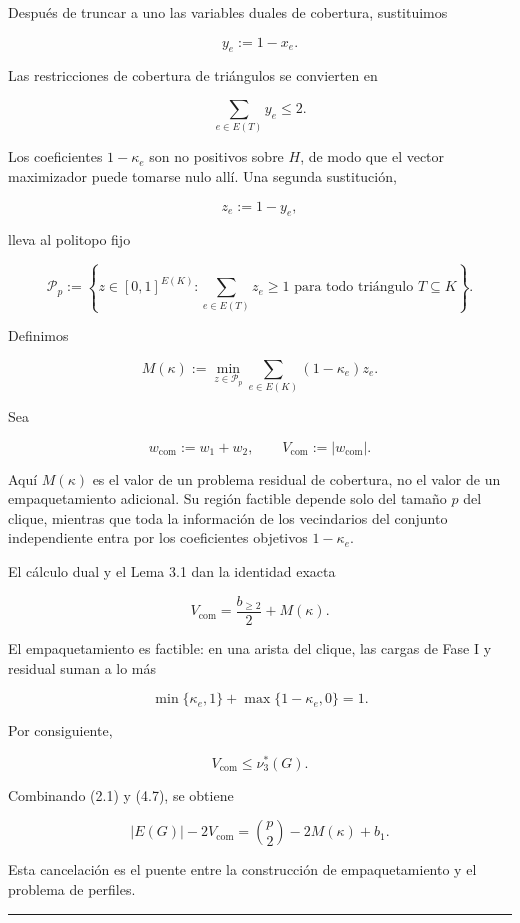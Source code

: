 \documentclass[
  11pt,
]{article}
\begin{document}
Después de truncar a uno las variables duales de cobertura, sustituimos

\[
y_e:=1-x_e.
\]

Las restricciones de cobertura de triángulos se convierten en

\[
\sum_{e\in E(T)}y_e\le2.
\]

Los coeficientes \(1-\kappa_e\) son no positivos sobre \(H\), de modo
que el vector maximizador puede tomarse nulo allí. Una segunda
sustitución,

\[
z_e:=1-y_e,
\]

lleva al politopo fijo

\[
\mathcal P_p
:=
\left\{
z\in[0,1]^{E(K)}:
\sum_{e\in E(T)}z_e\ge1
\text{ para todo triángulo }T\subseteq K
\right\}.
\tag{4.5}
\]

Definimos

\[
M(\kappa)
:=
\min_{z\in\mathcal P_p}
\sum_{e\in E(K)}(1-\kappa_e)z_e.
\tag{4.6}
\]

Sea

\[
w_{\mathrm{com}}:=w_1+w_2,
\qquad
V_{\mathrm{com}}:=|w_{\mathrm{com}}|.
\]

Aquí \(M(\kappa)\) es el valor de un problema residual de cobertura, no
el valor de un empaquetamiento adicional. Su región factible depende
solo del tamaño \(p\) del clique, mientras que toda la información de
los vecindarios del conjunto independiente entra por los coeficientes
objetivos \(1-\kappa_e\).

El cálculo dual y el Lema 3.1 dan la identidad exacta

\[
\boxed{
V_{\mathrm{com}}
=
\frac{b_{\ge2}}2+M(\kappa).
}
\tag{4.7}
\]

El empaquetamiento es factible: en una arista del clique, las cargas de
Fase I y residual suman a lo más

\[
\min\{\kappa_e,1\}
+
\max\{1-\kappa_e,0\}
=
1.
\]

Por consiguiente,

\[
V_{\mathrm{com}}\le\nu_3^*(G).
\tag{4.8}
\]

Combinando (2.1) y (4.7), se obtiene

\[
\boxed{
|E(G)|-2V_{\mathrm{com}}
=
\binom{p}{2}-2M(\kappa)+b_1.
}
\tag{4.9}
\]

Esta cancelación es el puente entre la construcción de empaquetamiento y
el problema de perfiles.

\begin{center}\rule{0.5\linewidth}{0.5pt}\end{center}
\end{document}
